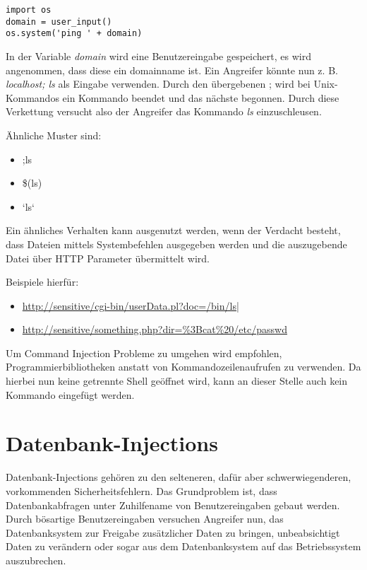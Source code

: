 \begin{verbatim}
import os
domain = user_input()
os.system('ping ' + domain)
\end{verbatim}

In der Variable \textit{domain} wird eine Benutzereingabe gespeichert, es wird angenommen, dass diese ein domainname ist. Ein Angreifer könnte nun z. B. \textit{localhost; ls} als Eingabe verwenden. Durch den übergebenen ; wird bei Unix-Kommandos ein Kommando beendet und das nächste begonnen. Durch diese Verkettung versucht also der Angreifer das Kommando \textit{ls} einzuschleusen.

Ähnliche Muster sind:

\begin{itemize}
\item ;ls
\item \$(ls)
\item `ls`
\end{itemize}

Ein ähnliches Verhalten kann ausgenutzt werden, wenn der Verdacht besteht, dass Dateien mittels Systembefehlen ausgegeben werden und die auszugebende Datei über HTTP Parameter übermittelt wird.

Beispiele hierfür:

\begin{itemize}
\item \url{http://sensitive/cgi-bin/userData.pl?doc=/bin/ls|}
\item \url{http://sensitive/something.php?dir=\%3Bcat\%20/etc/passwd}
\end{itemize}

Um Command Injection Probleme zu umgehen wird empfohlen, Programmierbibliotheken anstatt von Kommandozeilenaufrufen zu verwenden. Da hierbei nun keine getrennte Shell geöffnet wird, kann an dieser Stelle auch kein Kommando eingefügt werden.

\section{Datenbank-Injections}

Datenbank-Injections gehören zu den selteneren, dafür aber schwerwiegenderen, vorkommenden Sicherheitsfehlern. Das Grundproblem ist, dass Datenbankabfragen unter Zuhilfename von Benutzereingaben gebaut werden. Durch bösartige Benutzereingaben versuchen Angreifer nun, das Datenbanksystem zur Freigabe zusätzlicher Daten zu bringen, unbeabsichtigt Daten zu verändern oder sogar aus dem Datenbanksystem auf das Betriebssystem auszubrechen.


